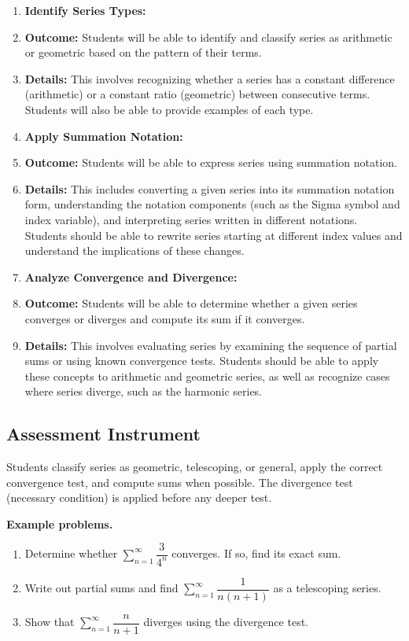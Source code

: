 \begin{enumerate}
    \item \textbf{Identify Series Types:}
    \item \textbf{Outcome:} Students will be able to identify and classify series as arithmetic or geometric based on the pattern of their terms.
    \item \textbf{Details:} This involves recognizing whether a series has a constant difference (arithmetic) or a constant ratio (geometric) between consecutive terms. Students will also be able to provide examples of each type.
    \item \textbf{Apply Summation Notation:}
    \item \textbf{Outcome:} Students will be able to express series using summation notation.
    \item \textbf{Details:} This includes converting a given series into its summation notation form, understanding the notation components (such as the Sigma symbol and index variable), and interpreting series written in different notations. Students should be able to rewrite series starting at different index values and understand the implications of these changes.
    \item \textbf{Analyze Convergence and Divergence:}
    \item \textbf{Outcome:} Students will be able to determine whether a given series converges or diverges and compute its sum if it converges.
    \item \textbf{Details:} This involves evaluating series by examining the sequence of partial sums or using known convergence tests. Students should be able to apply these concepts to arithmetic and geometric series, as well as recognize cases where series diverge, such as the harmonic series.
\end{enumerate}

\subsection{Assessment Instrument}
\label{ssec:seri-2a98}

Students classify series as geometric, telescoping, or general, apply the correct convergence test, and compute sums when possible. The divergence test (necessary condition) is applied before any deeper test.

\textbf{Example problems.}

\begin{enumerate}
    \item Determine whether $\sum_{n=1}^{\infty}\dfrac{3}{4^n}$ converges. If so, find its exact sum.
    \item Write out partial sums and find $\sum_{n=1}^{\infty}\dfrac{1}{n(n+1)}$ as a telescoping series.
    \item Show that $\sum_{n=1}^{\infty}\dfrac{n}{n+1}$ diverges using the divergence test.
\end{enumerate}

